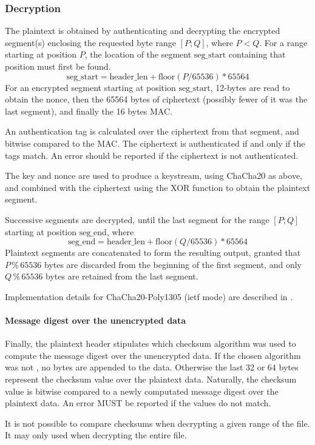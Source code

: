 \subsubsection{Decryption}
The plaintext is obtained by authenticating and decrypting the encrypted segment(s) enclosing the requested byte range $[P;Q]$, where $P<Q$.
%
For a range starting at position $P$, the location of the segment
$\text{seg\_start}$ containing that position must first be found.
%
$$\text{seg\_start} = \text{header\_len} + \text{floor}(P/65536) * 65564$$
%
For an encrypted segment starting at position $\text{seg\_start}$, 12-bytes are read to obtain the nonce, then the 65564 bytes of ciphertext (possibly fewer of it was the last segment), and finally the 16 bytes MAC.

An authentication tag is calculated over the ciphertext from that segment, and bitwise compared to the MAC. The ciphertext is authenticated if and only if the tags match.
%
An error should be reported if the ciphertext is not authenticated.

The key and nonce are used to produce a keystream, using ChaCha20 as above, and combined with the ciphertext using the XOR function to obtain the plaintext segment.

Successive segments are decrypted, until the last segment for the range $[P;Q]$ starting at position $\text{seg\_end}$, where
$$\text{seg\_end} = \text{header\_len} + \text{floor}(Q/65536) *
65564$$
%
Plaintext segments are concatenated to form the resulting output, granted that $P \mathbin{\%} 65536$ bytes are discarded from the beginning of the first segment, and only $Q \mathbin{\%} 65536$ bytes are retained from the last segment.

Implementation details for ChaCha20-Poly1305 (ietf mode) are described in \cite{RFC8439}.

\paragraph{Message digest over the unencrypted data}%
Finally, the plaintext header stipulates which checksum algorithm was used to compute the message digest over the unencrypted data. 
If the chosen algorithm was not , no bytes are appended to the data.
Otherwise the last 32 or 64 bytes represent the checksum value over the plaintext data.
% 
Naturally, the checksum value is bitwise compared to a newly computated message digest over the plaintext data. 
An error MUST be reported if the values do not match.

It is not possible to compare checksums when decrypting a given range of the file.
It may only used when decrypting the entire file.
